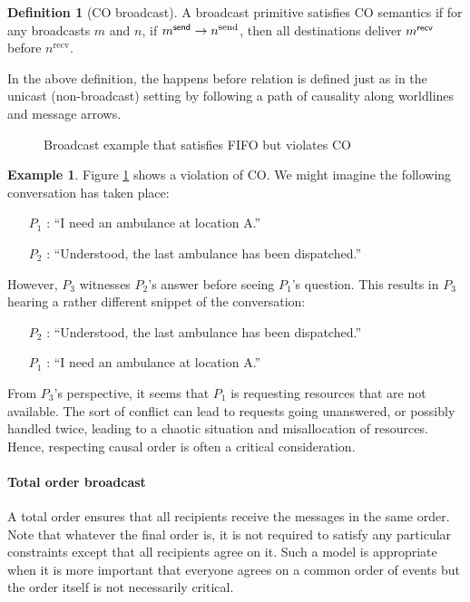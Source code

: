 \documentclass[]             %
{NASA}                       %
\theoremstyle{definition}
\newtheorem{example}{Example}[section]
\newtheorem{definition}{Definition}[section]
\providecommand{\tightlist}{%
  \setlength{\itemsep}{0pt}\setlength{\parskip}{0pt}}
\begin{document}
\begin{definition}[CO broadcast]
  \label{def:causalorder-bcast}
  A broadcast primitive satisfies CO semantics if for any broadcasts
  $m$ and $n$, if $m_{}^{\mathsf{send}} \to n^{\textrm{send}}$, then all
  destinations deliver $m_{}^{\mathsf{recv}}$ before $n^{\textrm{recv}}$.
\end{definition}
In the above definition, the happens before relation is defined just
as in the unicast (non-broadcast) setting by following a path of
causality along worldlines and message arrows.

\begin{figure}[h]
  \centering 
  \caption{Broadcast example that satisfies FIFO but violates CO}
  \label{fig:broadcast-fifo-1}
\end{figure}

\begin{example}
Figure \ref{fig:broadcast-fifo-1} shows a violation of CO. We might
imagine the following conversation has taken place:
\begin{itemize}
  \tightlist
\item [$P_1$]: ``I need an ambulance at location A.''
\item [$P_2$]: ``Understood, the last ambulance has been dispatched.''
\end{itemize}
However, $P_3$ witnesses $P_2$'s answer before seeing $P_1$'s
question. This results in $P_3$ hearing a rather different snippet of
the conversation:
\begin{itemize}
  \tightlist
\item [$P_2$]: ``Understood, the last ambulance has been dispatched.''
\item [$P_1$]: ``I need an ambulance at location A.''
\end{itemize}
From $P_3$'s perspective, it seems that $P_1$ is requesting resources
that are not available. The sort of conflict can lead to requests
going unanswered, or possibly handled twice, leading to a chaotic
situation and misallocation of resources. Hence, respecting causal
order is often a critical consideration.
\end{example}

\paragraph{Total order broadcast}
A total order ensures that all recipients receive the messages in the
same order. Note that whatever the final order is, it is not required
to satisfy any particular constraints except that all recipients agree
on it. Such a model is appropriate when it is more important that
everyone agrees on a common order of events but the order itself is
not necessarily critical.
\end{document}

